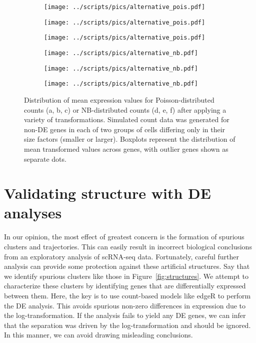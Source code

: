 \documentclass[10pt,letterpaper]{article}
\begin{document}
\begin{figure}
\centering
\begin{subfigure}[b]{0.32\textwidth}
    \texttt{[image: ../scripts/pics/alternative\_pois.pdf]}
    \caption{}
\end{subfigure}
\begin{subfigure}[b]{0.32\textwidth}
    \texttt{[image: ../scripts/pics/alternative\_pois.pdf]}
    \caption{}
\end{subfigure}
\begin{subfigure}[b]{0.32\textwidth}
    \texttt{[image: ../scripts/pics/alternative\_pois.pdf]}
    \caption{}
\end{subfigure}
\begin{subfigure}[b]{0.32\textwidth}
    \texttt{[image: ../scripts/pics/alternative\_nb.pdf]}
    \caption{}
\end{subfigure}
\begin{subfigure}[b]{0.32\textwidth}
    \texttt{[image: ../scripts/pics/alternative\_nb.pdf]}
    \caption{}
\end{subfigure}
\begin{subfigure}[b]{0.32\textwidth}
    \texttt{[image: ../scripts/pics/alternative\_nb.pdf]}
    \caption{}
\end{subfigure}
\caption{Distribution of mean expression values for Poisson-distributed counts (a, b, c) or NB-distributed counts (d, e, f) after applying a variety of transformations.
Simulated count data was generated for non-DE genes in each of two groups of cells differing only in their size factors (smaller or larger).    
Boxplots represent the distribution of mean transformed values across genes, with outlier genes shown as separate dots.
}
\label{fig:alttransform}
\end{figure}

\section{Validating structure with DE analyses}
In our opinion, the most effect of greatest concern is the formation of spurious clusters and trajectories.
This can easily result in incorrect biological conclusions from an exploratory analysis of scRNA-seq data.
Fortunately, careful further analysis can provide some protection against these artificial structures.
Say that we identify spurious clusters like those in Figure~\ref{fig:structures}.
We attempt to characterize these clusters by identifying genes that are differentially expressed between them.
Here, the key is to use count-based models like edgeR \cite{robinson2010edgeR} to perform the DE analysis.
This avoids spurious non-zero differences in expression due to the log-transformation.
If the analysis fails to yield any DE genes, we can infer that the separation was driven by the log-transformation and should be ignored.
In this manner, we can avoid drawing misleading conclusions.
\end{document}
